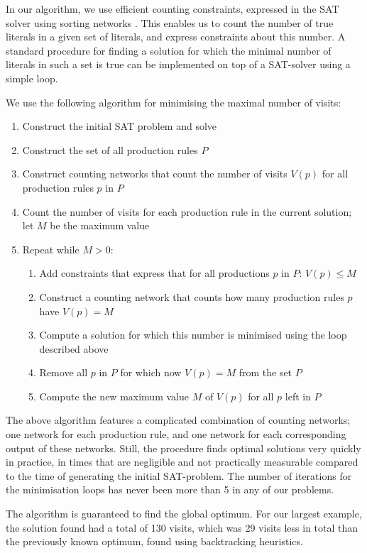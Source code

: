 \documentclass{llncs}
\begin{document}
In our algorithm, we use efficient counting constraints, expressed in the SAT solver using sorting networks \cite{counting-sorting}. This enables us to count the number of true literals in a given set of literals, and express constraints about this number. A standard procedure for finding a solution for which the minimal number of literals in such a set is true can be implemented on top of a SAT-solver using a simple loop.

We use the following algorithm for minimising the maximal number of visits:
\begin{enumerate}
\item Construct the initial SAT problem and solve
\item Construct the set of all production rules $P$
\item Construct counting networks that count the number of visits $V(p)$ for all production rules $p$ in $P$
\item Count the number of visits for each production rule in the current solution; let $M$ be the maximum value 
\item Repeat while $M > 0$:
\begin{enumerate}
\item Add constraints that express that for all productions $p$ in $P$: $V(p) \leq M$
\item Construct a counting network that counts how many production rules $p$ have $V(p)=M$
\item Compute a solution for which this number is minimised using the loop described above
\item Remove all $p$ in $P$ for which now $V(p) = M$ from the set $P$
\item Compute the new maximum value $M$ of $V(p)$ for all $p$ left in $P$
\end{enumerate}
\end{enumerate}

The above algorithm features a complicated combination of counting networks; one network for each production rule, and one network for each corresponding output of these networks. Still, the procedure finds optimal solutions very quickly in practice, in times that are negligible and not practically measurable compared to the time of generating the initial SAT-problem. The number of iterations for the minimisation loops has never been more than 5 in any of our problems.

The algorithm is guaranteed to find the global optimum. For our largest example, the solution found had a total of 130 visits, which was 29 visits less in total than the previously known optimum, found using backtracking heuristics.
\end{document}

